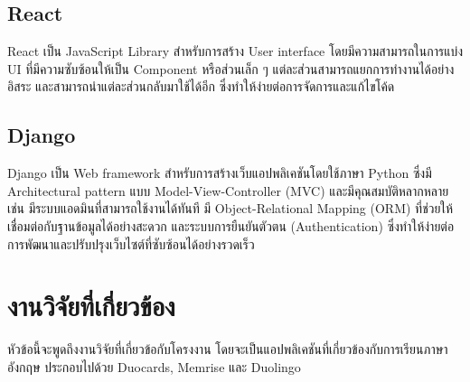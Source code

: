 \documentclass[12pt,oneside,openright,a4paper]{cpe-thai-project}
\begin{document}
\subsection{React}

\hspace{1cm}
React \cite{React} เป็น JavaScript Library สำหรับการสร้าง User interface โดยมีความสามารถในการแบ่ง UI ที่มีความซับซ้อนให้เป็น Component หรือส่วนเล็ก ๆ
แต่ละส่วนสามารถแยกการทำงานได้อย่างอิสระ และสามารถนำแต่ละส่วนกลับมาใช้ได้อีก ซึ่งทำให้ง่ายต่อการจัดการและแก้ไขโค้ด



\subsection{Django}

\hspace{1cm}
Django \cite{Django} เป็น Web framework สำหรับการสร้างเว็บแอปพลิเคชันโดยใช้ภาษา Python ซึ่งมี Architectural pattern
แบบ Model-View-Controller (MVC) และมีคุณสมบัติหลากหลาย เช่น มีระบบแอดมินที่สามารถใช้งานได้ทันที
มี Object-Relational Mapping (ORM) ที่ช่วยให้เชื่อมต่อกับฐานข้อมูลได้อย่างสะดวก และระบบการยืนยันตัวตน (Authentication)
ซึ่งทำให้ง่ายต่อการพัฒนาและปรับปรุงเว็บไซต์ที่ซับซ้อนได้อย่างรวดเร็ว



\pagebreak
\section{งานวิจัยที่เกี่ยวข้อง}

\hspace{1cm}
หัวข้อนี้จะพูดถึงงานวิจัยที่เกี่ยวข้อกับโครงงาน โดยจะเป็นแอปพลิเคชันที่เกี่ยวข้องกับการเรียนภาษาอังกฤษ
ประกอบไปด้วย Duocards, Memrise และ Duolingo
\end{document}
